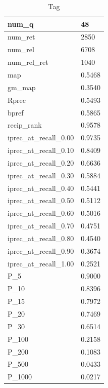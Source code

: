 \begin{table}[htb]
{\begin{tabular}{ | l | l | }
	num\_q & 48 \\ \hline
	num\_ret & 2850 \\ \hline
	num\_rel & 6708 \\ \hline
	num\_rel\_ret & 1040 \\ \hline
	map & 0.5468 \\ \hline
	gm\_map & 0.3540 \\ \hline
	Rprec & 0.5493 \\ \hline
	bpref & 0.5865 \\ \hline
	recip\_rank & 0.9578 \\ \hline
	iprec\_at\_recall\_0.00 & 0.9735 \\ \hline
	iprec\_at\_recall\_0.10 & 0.8409 \\ \hline
	iprec\_at\_recall\_0.20 & 0.6636 \\ \hline
	iprec\_at\_recall\_0.30 & 0.5884 \\ \hline
	iprec\_at\_recall\_0.40 & 0.5441 \\ \hline
	iprec\_at\_recall\_0.50 & 0.5112 \\ \hline
	iprec\_at\_recall\_0.60 & 0.5016 \\ \hline
	iprec\_at\_recall\_0.70 & 0.4751 \\ \hline
	iprec\_at\_recall\_0.80 & 0.4540 \\ \hline
	iprec\_at\_recall\_0.90 & 0.3674 \\ \hline
	iprec\_at\_recall\_1.00 & 0.2521 \\ \hline
	P\_5 & 0.9000 \\ \hline
	P\_10 & 0.8396 \\ \hline
	P\_15 & 0.7972 \\ \hline
	P\_20 & 0.7469 \\ \hline
	P\_30 & 0.6514 \\ \hline
	P\_100 & 0.2158 \\ \hline
	P\_200 & 0.1083 \\ \hline
	P\_500 & 0.0433 \\ \hline
	P\_1000 & 0.0217 \\ \hline
    \end{tabular}
    \caption{Tag}
    }
\end{table}



